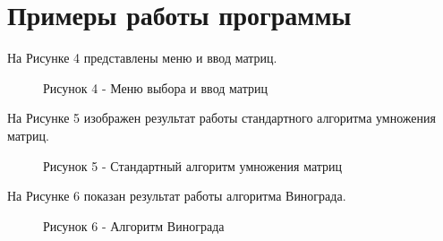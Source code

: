 \documentclass[12pt]{report}
\begin{document}
	\section{Примеры работы программы}
	На Рисунке 4 представлены меню и ввод матриц.
	\begin{figure}[h]
		\caption*{Рисунок 4 - Меню выбора и ввод матриц}
	\end{figure}
	
	\newpage
	На Рисунке 5 изображен результат работы стандартного алгоритма умножения матриц.
	\begin{figure}[h]
		\caption*{Рисунок 5 - Стандартный алгоритм умножения матриц}
	\end{figure}
	
	
	На Рисунке 6 показан результат работы алгоритма Винограда.
	\begin{figure}[h]
		\caption*{Рисунок 6 - Алгоритм Винограда}
	\end{figure}
	
\end{document}
